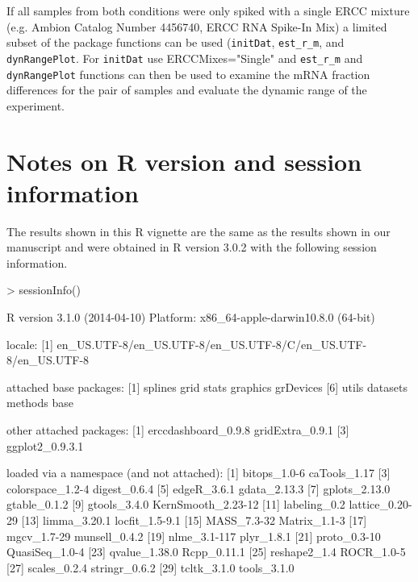 \documentclass{article}
\begin{document}
If all samples from both conditions were only spiked with a single ERCC mixture 
(e.g. Ambion Catalog Number 4456740, ERCC RNA Spike-In Mix) a limited subset of 
the package functions can be used (\verb|initDat|, \verb|est_r_m|, and 
\verb|dynRangePlot|. For \verb|initDat| use ERCCMixes="Single" and \verb|est_r_m| and 
\verb|dynRangePlot| functions can then be used to examine the mRNA fraction 
differences for the pair of samples and evaluate the dynamic range of the 
experiment. 

\section{Notes on R version and session information}
The results shown in this R vignette are the same as the results shown in our
manuscript and were obtained in R version 3.0.2 with the following session 
information.
\begin{Schunk}
\begin{Sinput}
> sessionInfo()
\end{Sinput}
\begin{Soutput}
R version 3.1.0 (2014-04-10)
Platform: x86_64-apple-darwin10.8.0 (64-bit)

locale:
[1] en_US.UTF-8/en_US.UTF-8/en_US.UTF-8/C/en_US.UTF-8/en_US.UTF-8

attached base packages:
[1] splines   grid      stats     graphics  grDevices
[6] utils     datasets  methods   base     

other attached packages:
[1] erccdashboard_0.9.8 gridExtra_0.9.1    
[3] ggplot2_0.9.3.1    

loaded via a namespace (and not attached):
 [1] bitops_1.0-6       caTools_1.17      
 [3] colorspace_1.2-4   digest_0.6.4      
 [5] edgeR_3.6.1        gdata_2.13.3      
 [7] gplots_2.13.0      gtable_0.1.2      
 [9] gtools_3.4.0       KernSmooth_2.23-12
[11] labeling_0.2       lattice_0.20-29   
[13] limma_3.20.1       locfit_1.5-9.1    
[15] MASS_7.3-32        Matrix_1.1-3      
[17] mgcv_1.7-29        munsell_0.4.2     
[19] nlme_3.1-117       plyr_1.8.1        
[21] proto_0.3-10       QuasiSeq_1.0-4    
[23] qvalue_1.38.0      Rcpp_0.11.1       
[25] reshape2_1.4       ROCR_1.0-5        
[27] scales_0.2.4       stringr_0.6.2     
[29] tcltk_3.1.0        tools_3.1.0       
\end{Soutput}
\end{Schunk}
 
\end{document}
